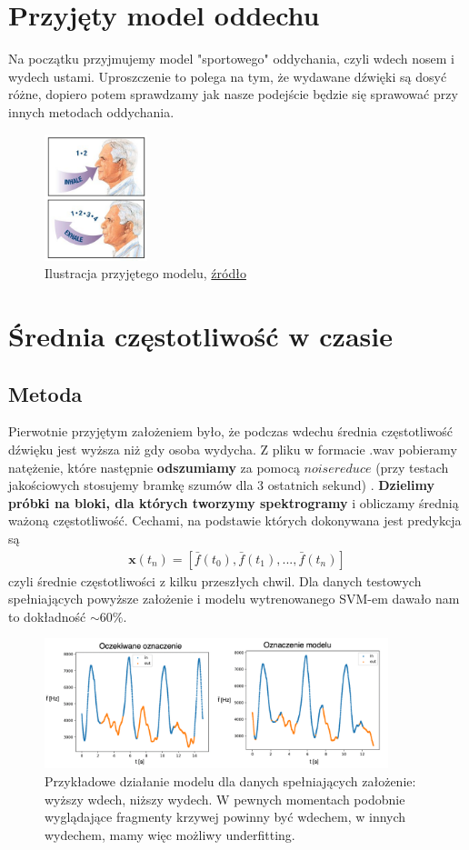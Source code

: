 \documentclass[polish]{article}
\begin{document}
\section{Przyjęty model oddechu}
Na początku przyjmujemy model "sportowego" oddychania, czyli wdech nosem i wydech ustami.
Uproszczenie to polega na tym, że wydawane dźwięki są dosyć różne, dopiero potem sprawdzamy jak nasze podejście będzie się sprawować
przy innych metodach oddychania.
\begin{figure}[H]
	\centering
	\includegraphics[width=3cm]{model_oddechu}
  	\caption{Ilustracja przyjętego modelu,  \href{https://www.quora.com/Should-I-exhale-from-the-mouth-or-nose-while-deep-breathing}{źródło}}
\end{figure}
\section{Średnia częstotliwość w czasie}
\subsection{Metoda}
Pierwotnie przyjętym założeniem było, że podczas wdechu średnia częstotliwość dźwięku jest wyższa niż
gdy osoba wydycha. Z pliku w formacie .wav pobieramy natężenie, które następnie \textbf{odszumiamy} za pomocą $noisereduce$ (przy testach jakościowych stosujemy bramkę szumów dla 3 ostatnich sekund) . 
\textbf{Dzielimy próbki na bloki, dla których tworzymy spektrogramy} i obliczamy
średnią ważoną częstotliwość.
Cechami, na podstawie których dokonywana jest predykcja są  
\begin{gather*}
\boldsymbol x (t_n) = [\bar{f}(t_0), \bar{f}(t_1), ..., \bar{f}(t_n)]
\end{gather*}
czyli średnie częstotliwości z kilku przeszłych chwil.
Dla danych testowych spełniających powyższe założenie i modelu wytrenowanego SVM-em dawało nam to dokładność $\sim 60\%$.
\begin{figure}[H]
	\centering
	\includegraphics[width=10cm]{porownanie_srednie}
	\caption{Przykładowe działanie modelu dla danych spełniających założenie: wyższy wdech, niższy wydech.
	W pewnych momentach podobnie wyglądające fragmenty krzywej powinny być wdechem, w innych wydechem, mamy więc możliwy underfitting.}
\end{figure}
\end{document}
